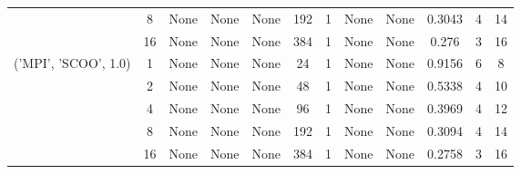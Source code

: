 \begin{tabular}{cccccccccccc}
& 8& None& None& None& 192& 1& None& None& 0.3043& 4& 14\\
& 16& None& None& None& 384& 1& None& None& 0.276& 3& 16\\
\hline
\multirow{5}{*}{('MPI', 'SCOO', 1.0)}& 1& None& None& None& 24& 1& None& None& 0.9156& 6& 8\\
& 2& None& None& None& 48& 1& None& None& 0.5338& 4& 10\\
& 4& None& None& None& 96& 1& None& None& 0.3969& 4& 12\\
& 8& None& None& None& 192& 1& None& None& 0.3094& 4& 14\\
& 16& None& None& None& 384& 1& None& None& 0.2758& 3& 16\\
\hline
\end{tabular}



